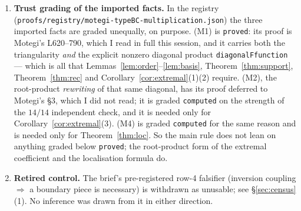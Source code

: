 \documentclass[11pt]{article}
\theoremstyle{plain}
\theoremstyle{definition}
\theoremstyle{remark}
\begin{document}
\begin{enumerate}
are both classified by one-dimensional formal groups is quoted from
Zinn-Justin's lecture notes, \emph{Lectures on Geometry, Quantum Integrability
and Symmetric Functions}, p.~1 --- a document marked ``(IN PROGRESS)'' of which I
have read page~1 first-hand.  It is used in \S\ref{sec:census} only to name the
rows of a table, is not attributed to a theorem, and nothing below
\S\ref{sec:census} depends on it.
\item \textbf{Trust grading of the imported facts.}  In the registry
(\texttt{proofs/registry/motegi-typeBC-multiplication.json}) the three imported
facts are graded unequally, on purpose.  (M1) is \texttt{proved}: its proof is
Motegi's L620--790, which I read in full this session, and it carries both the
triangularity \emph{and} the explicit nonzero diagonal product
\texttt{diagonalFfunction} --- which is all that
Lemmas~\ref{lem:order}--\ref{lem:basis}, Theorem~\ref{thm:support},
Theorem~\ref{thm:rec} and Corollary~\ref{cor:extremal}(1)(2) require.  (M2), the
root-product \emph{rewriting} of that same diagonal, has its proof deferred to
Motegi's \S3, which I did not read; it is graded \texttt{computed} on the
strength of the $14/14$ independent check, and it is needed only for
Corollary~\ref{cor:extremal}(3).  (M4) is graded \texttt{computed} for the same
reason and is needed only for Theorem~\ref{thm:loc}.  So the main rule does not
lean on anything graded below \texttt{proved}; the root-product form of the
extremal coefficient and the localisation formula do.
\item \textbf{Retired control.}  The brief's pre-registered row-4 falsifier
(inversion coupling $\Rightarrow$ a boundary piece is necessary) is withdrawn as
unusable; see \S\ref{sec:census}(1).  No inference was drawn from it in either
direction.
\end{enumerate}
\end{document}
